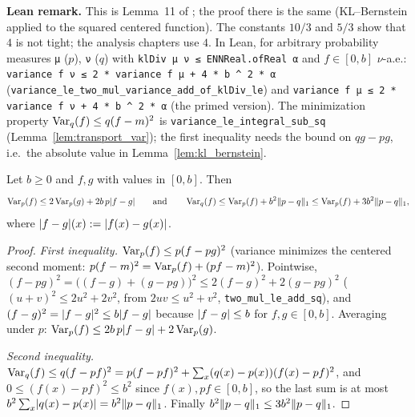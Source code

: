 \textbf{Lean remark.} This is Lemma~11 of \cite{menard2021fast}; the proof there is the same
(KL--Bernstein applied to the squared centered function). The constants $10/3$ and $5/3$ show
that $4$ is not tight; the analysis chapters use $4$. In Lean, for arbitrary probability measures
\texttt{μ} ($p$), \texttt{ν} ($q$) with \texttt{klDiv μ ν ≤ ENNReal.ofReal α} and $f \in [0, b]$
$\nu$-a.e.: \texttt{variance f ν ≤ 2 * variance f μ + 4 * b \^{} 2 * α}
(\texttt{variance\_le\_two\_mul\_variance\_add\_of\_klDiv\_le}) and
\texttt{variance f μ ≤ 2 * variance f ν + 4 * b \^{} 2 * α} (the primed version). The minimization
property $\operatorname{Var}_q(f) \le q(f - m)^2$ is \texttt{variance\_le\_integral\_sub\_sq}
(Lemma~\ref{lem:transport_var}); the first inequality needs the bound on $qg - pg$, i.e.\ the
absolute value in Lemma~\ref{lem:kl_bernstein}.

\begin{lemma}\label{lem:transport_var}
\leanok
Let $b \ge 0$ and $f, g$ with values in $[0, b]$. Then
\[
  \operatorname{Var}_p(f) \le 2\operatorname{Var}_p(g) + 2b\, p\lvert f - g \rvert \qquad \text{and} \qquad
  \operatorname{Var}_q(f) \le \operatorname{Var}_p(f) + b^2 \lVert p - q \rVert_1 \le \operatorname{Var}_p(f) + 3b^2\lVert p - q \rVert_1 ,
\]
where $\lvert f - g \rvert(x) := \lvert f(x) - g(x) \rvert$.
\end{lemma}

\begin{proof}
\leanok
\emph{First inequality.} $\operatorname{Var}_p(f) \le p(f - pg)^2$ (variance minimizes the centered second
moment: $p(f - m)^2 = \operatorname{Var}_p(f) + (pf - m)^2$). Pointwise,
$(f - pg)^2 = \big((f - g) + (g - pg)\big)^2 \le 2(f - g)^2 + 2(g - pg)^2$
($(u + v)^2 \le 2u^2 + 2v^2$, from $2uv \le u^2 + v^2$, \texttt{two\_mul\_le\_add\_sq}), and $(f - g)^2 = \lvert f - g \rvert^2 \le b\lvert f - g \rvert$
because $\lvert f - g \rvert \le b$ for $f, g \in [0, b]$. Averaging under $p$:
$\operatorname{Var}_p(f) \le 2b\,p\lvert f - g \rvert + 2\operatorname{Var}_p(g)$.

\emph{Second inequality.} $\operatorname{Var}_q(f) \le q(f - pf)^2 = p(f - pf)^2 + \sum_x (q(x) - p(x))(f(x) - pf)^2$,
and $0 \le (f(x) - pf)^2 \le b^2$ since $f(x), pf \in [0, b]$, so the last sum is at most
$b^2\sum_x \lvert q(x) - p(x) \rvert = b^2\lVert p - q \rVert_1$. Finally $b^2\lVert p - q \rVert_1 \le 3b^2\lVert p - q \rVert_1$.
\end{proof}

